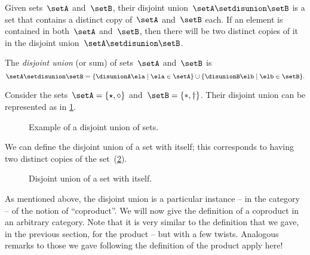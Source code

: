 Given sets~$\setA$ and~$\setB$, their disjoint union~$\setA \setdisunion \setB$ is a set that contains a distinct copy of~$\setA$ and~$\setB$ each. If an element is contained in both~$\setA$ and~$\setB$, then there will be two distinct copies of it in the disjoint union~$\setA \setdisunion \setB$.

\begin{definition}
  \label{def:disjoint-union}
  The \emph{disjoint union} (or sum) of sets~$\setA$ and~$\setB$ is
  \begin{equation}
    \setA \setdisunion \setB=\{\disunionA\ela \mid \ela\in \setA\}\cup\{\disunionB\elb \mid \elb\in \setB\}.
  \end{equation}
\end{definition}

\begin{example}
  Consider the sets~$\setA=\{\star, \diamond\}$ and~$\setB=\{\ast, \dagger\}$. Their disjoint union can be represented as in \cref{fig:disjoint}.
  \begin{figure}[h!]
    \begin{center}
    \end{center}
    \caption{Example of a disjoint union of sets.}
    \label{fig:disjoint}
  \end{figure}
\end{example}

We can define the disjoint union of a set with itself; this corresponds to having two distinct copies of the set~(\cref{fig:disjointself}).

\begin{figure}[h!]
  \begin{center}
    \caption{Disjoint union of a set with itself.}
    \label{fig:disjointself}
  \end{center}
\end{figure}

As mentioned above, the disjoint union is a particular instance -- in the category \Set  -- of the notion of ``coproduct''.
We will now give the definition of a coproduct in an arbitrary category. Note that it is very similar to the definition that we gave, in the previous section, for the product -- but with a few twists. Analogous remarks to those we gave following the definition of the product apply here!

